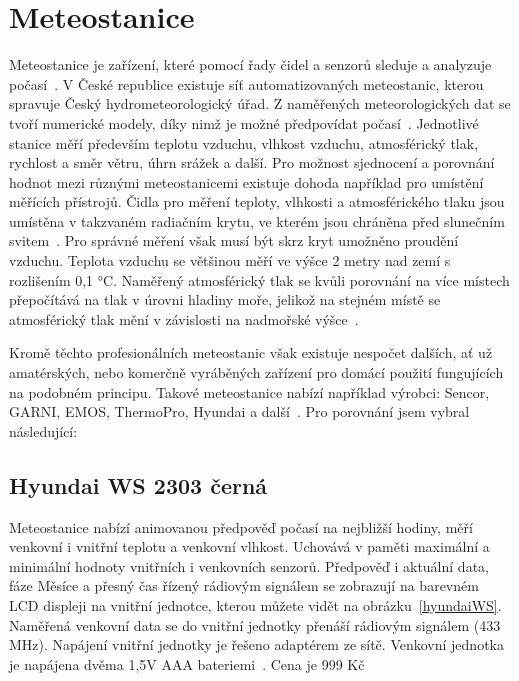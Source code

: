 
\chapter{Meteostanice}

    Meteostanice je zařízení, které pomocí řady čidel a senzorů sleduje a analyzuje počasí~\cite{JakVybratCHytrouMeteostanici}. V České republice existuje síť automatizovaných meteostanic, kterou spravuje Český hydrometeorologický úřad. Z naměřených meteorologických dat se tvoří numerické modely, díky nimž je možné předpovídat počasí~\cite{ChytraPetr}. Jednotlivé stanice měří především teplotu vzduchu, vlhkost vzduchu, atmosférický tlak, rychlost a směr větru, úhrn srážek a další. Pro možnost sjednocení a porovnání hodnot mezi různými meteostanicemi existuje dohoda například pro umístění měřících přístrojů. Čidla pro měření teploty, vlhkosti a atmosférického tlaku jsou umístěna v takzvaném radiačním krytu, ve kterém jsou chráněna před slunečním svitem~\cite{ChytraPetr}. Pro správné měření však musí být skrz kryt umožněno proudění vzduchu. Teplota vzduchu se většinou měří ve výšce 2 metry nad zemí s rozlišením 0,1 °C. Naměřený atmosférický tlak se kvůli porovnání na více místech přepočítává na tlak v úrovni hladiny moře, jelikož na stejném místě se atmosférický tlak mění v závislosti na nadmořské výšce~\cite{ChytraPetr}.
    
    Kromě těchto profesionálních meteostanic však existuje nespočet dalších, ať už amatérských, nebo komerčně vyráběných zařízení pro domácí použití fungujících na podobném principu. Takové meteostanice nabízí například výrobci: Sencor, GARNI, EMOS, ThermoPro, Hyundai a další~\cite{Meteostanice}. Pro porovnání jsem vybral následující: 

    \section{Hyundai WS 2303 černá}
        Meteostanice nabízí animovanou předpověď počasí na nejbližší hodiny, měří venkovní i vnitřní teplotu a venkovní vlhkost. Uchovává v paměti maximální a minimální hodnoty vnitřních i venkovních senzorů. Předpověď i aktuální data, fáze Měsíce a přesný čas řízený rádiovým signálem se zobrazují na barevném LCD displeji na vnitřní jednotce, kterou můžete vidět na obrázku~\ref{hyundaiWS}. Naměřená venkovní data se do vnitřní jednotky přenáší rádiovým signálem (433 MHz). Napájení vnitřní jednotky je řešeno adaptérem ze sítě. Venkovní jednotka je napájena dvěma 1,5V AAA bateriemi~\cite{HyundayWS2303}. Cena je 999 Kč
        
